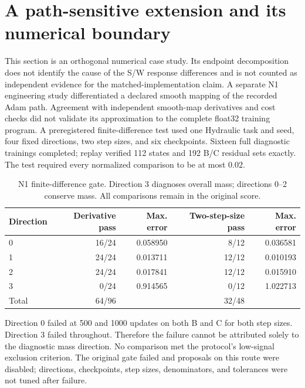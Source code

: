 \documentclass[11pt]{article}
\begin{document}
\section{A path-sensitive extension and its numerical boundary}
This section is an orthogonal numerical case study. Its endpoint decomposition does not identify the cause of the S/W response differences and is not counted as independent evidence for the matched-implementation claim.
A separate N1 engineering study differentiated a declared smooth mapping of the recorded Adam path. Agreement with independent smooth-map derivatives and cost checks did not validate its approximation to the complete float32 training program. A preregistered finite-difference test used one Hydraulic task and seed, four fixed directions, two step sizes, and six checkpoints. Sixteen full diagnostic trainings completed; replay verified 112 states and 192 B/C residual sets exactly. The test required every normalized comparison to be at most $0.02$.

\begin{table}[ht]
\centering\small
\caption{N1 finite-difference gate. Direction 3 diagnoses overall mass; directions 0--2 conserve mass. All comparisons remain in the original score.}
\begin{tabular}{lrrrr}\toprule
Direction & Derivative pass & Max. error & Two-step-size pass & Max. error\\\midrule
0 & 16/24 & 0.058950 & 8/12 & 0.036581\\
1 & 24/24 & 0.013711 & 12/12 & 0.010193\\
2 & 24/24 & 0.017841 & 12/12 & 0.015910\\
3 & 0/24 & 0.914565 & 0/12 & 1.022713\\\midrule
Total & 64/96 & & 32/48 &\\\bottomrule
\end{tabular}
\end{table}

Direction 0 failed at 500 and 1000 updates on both B and C for both step sizes. Direction 3 failed throughout. Therefore the failure cannot be attributed solely to the diagnostic mass direction. No comparison met the protocol's low-signal exclusion criterion. The original gate failed and proposals on this route were disabled; directions, checkpoints, step sizes, denominators, and tolerances were not tuned after failure.
\end{document}
